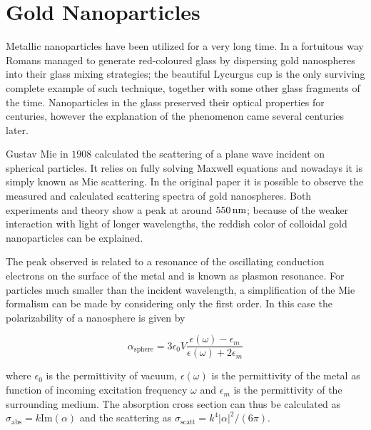 \section{Gold Nanoparticles}
Metallic nanoparticles have been utilized for a very long time. In a fortuitous
way Romans managed to generate red-coloured glass by dispersing gold nanospheres
into their glass mixing strategies; the beautiful Lycurgus
cup\cite{barber1990investigation} is the only surviving complete example of such
technique, together with some other glass fragments of the time. Nanoparticles
in the glass preserved their optical properties for centuries, however the
explanation of the phenomenon came several centuries later.

Gustav Mie in $1908$ calculated the scattering of a plane wave incident on
spherical particles\cite{mie1908beitrage}. It relies on fully solving Maxwell
equations and nowadays it is simply known as Mie scattering. In the original
paper it is possible to observe the measured and calculated scattering spectra
of gold nanospheres. Both experiments and theory show a peak at around $550\,\textrm{nm}$;
because of the weaker interaction with light of longer wavelengths, the reddish
color of colloidal gold nanoparticles can be explained.

The peak observed is related to a resonance of the oscillating conduction
electrons on the surface of the metal and is known as plasmon resonance. For
particles much smaller than the incident wavelength, a simplification of the Mie
formalism can be made by considering only the first order. In this case the
polarizability of a nanosphere is given by\cite{bohren2008absorption}

\begin{equation}\label{eqn:polarizability}
	\alpha_{\textrm{sphere}} =
	3\epsilon_0V\frac{\epsilon(\omega)-\epsilon_m}{\epsilon(\omega)+2\epsilon_m}
\end{equation}

\noindent where $\epsilon_0$ is the permittivity of vacuum, $\epsilon(\omega)$
is the permittivity of the metal as function of incoming excitation frequency $\omega$
and $\epsilon_m$ is the permittivity of the surrounding medium. The absorption
cross section can thus be calculated as
$\sigma_\textrm{abs}=k\textrm{Im}(\alpha)$ and the scattering as
$\sigma_\textrm{scatt}=k^4|\alpha|^2/(6\pi)$.

